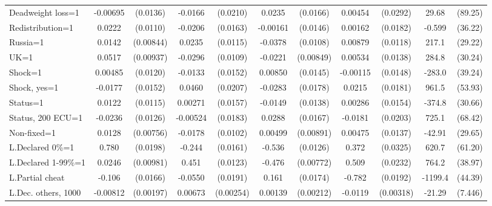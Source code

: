 \begin{tabular}{l|cccccc|cc|cc}
Deadweight loss=1& -0.00695         & (0.0136)&  -0.0166         & (0.0210)&   0.0235         & (0.0166)&  0.00454         & (0.0292)&    29.68         &  (89.25)\\
Redistribution=1&   0.0222\sym{**} & (0.0110)&  -0.0206         & (0.0163)& -0.00161         & (0.0146)&  0.00162         & (0.0182)&   -0.599         &  (36.22)\\
Russia=1        &   0.0142\sym{*}  &(0.00844)&   0.0235\sym{**} & (0.0115)&  -0.0378\sym{***}& (0.0108)&  0.00879         & (0.0118)&    217.1\sym{***}&  (29.22)\\
UK=1            &   0.0517\sym{***}&(0.00937)&  -0.0296\sym{***}& (0.0109)&  -0.0221\sym{***}&(0.00849)&  0.00534         & (0.0138)&    284.8\sym{***}&  (30.24)\\
Shock=1         &  0.00485         & (0.0120)&  -0.0133         & (0.0152)&  0.00850         & (0.0145)& -0.00115         & (0.0148)&   -283.0\sym{***}&  (39.24)\\
Shock, yes=1    &  -0.0177         & (0.0152)&   0.0460\sym{**} & (0.0207)&  -0.0283         & (0.0178)&   0.0215         & (0.0181)&    961.5\sym{***}&  (53.93)\\
Status=1        &   0.0122         & (0.0115)&  0.00271         & (0.0157)&  -0.0149         & (0.0138)&  0.00286         & (0.0154)&   -374.8\sym{***}&  (30.66)\\
Status, 200 ECU=1&  -0.0236\sym{*}  & (0.0126)& -0.00524         & (0.0183)&   0.0288\sym{*}  & (0.0167)&  -0.0181         & (0.0203)&    725.1\sym{***}&  (68.42)\\
Non-fixed=1     &   0.0128\sym{*}  &(0.00756)&  -0.0178\sym{*}  & (0.0102)&  0.00499         &(0.00891)&  0.00475         & (0.0137)&   -42.91         &  (29.65)\\
L.Declared 0\%=1&    0.780\sym{***}& (0.0198)&   -0.244\sym{***}& (0.0161)&   -0.536\sym{***}& (0.0126)&    0.372\sym{***}& (0.0325)&    620.7\sym{***}&  (61.20)\\
L.Declared 1-99\%=1&   0.0246\sym{**} &(0.00981)&    0.451\sym{***}& (0.0123)&   -0.476\sym{***}&(0.00772)&    0.509\sym{***}& (0.0232)&    764.2\sym{***}&  (38.97)\\
L.Partial cheat &   -0.106\sym{***}& (0.0166)&  -0.0550\sym{***}& (0.0191)&    0.161\sym{***}& (0.0174)&   -0.782\sym{***}& (0.0192)&  -1199.4\sym{***}&  (44.39)\\
L.Dec. others, 1000& -0.00812\sym{***}&(0.00197)&  0.00673\sym{***}&(0.00254)&  0.00139         &(0.00212)&  -0.0119\sym{***}&(0.00318)&   -21.29\sym{***}&  (7.446)\\

\end{tabular}
